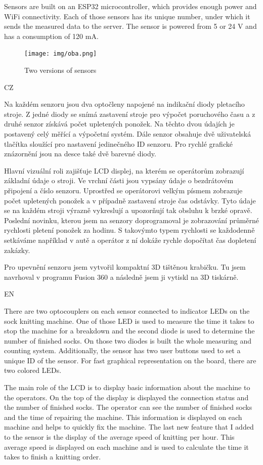 \documentclass[12pt, a4paper]{article}
\begin{document}
Sensors are built on an ESP32 microcontroller, which provides enough power and WiFi connectivity.
Each of those sensors has its unique number, under which it sends the measured data to the server.
The sensor is powered from 5 or 24 V and has a consumption of 120 mA.

\begin{figure}[t]
    \centering
    \texttt{[image: img/oba.png]}
    \caption{Two versions of sensors}
    \label{fig:dveVerze}
\end{figure}

CZ

Na každém senzoru jsou dva optočleny napojené na indikační diody pletacího stroje.
Z jedné diody se snímá zastavení stroje pro výpočet poruchového času a z druhé senzor získává počet upletených ponožek.
Na těchto dvou údajích je postavený celý měřící a výpočetní systém.
Dále senzor obsahuje dvě uživatelská tlačítka sloužící pro nastavení jedinečného ID senzoru.
Pro rychlé grafické znázornění jsou na desce také dvě barevné diody.

Hlavní vizuální roli zajišťuje LCD displej, na kterém se operátorům zobrazují základní údaje o stroji.
Ve vrchní části jsou vypsány údaje o bezdrátovém připojení a číslo senzoru.
Uprostřed se operátorovi velkým písmem zobrazuje počet upletených ponožek a v případně zastavení stroje čas odstávky.
Tyto údaje se na každém stroji výrazně vykreslují a upozorňují tak obsluhu k brzké opravě.
Poslední novinku, kterou jsem na senzory doprogramoval je zobrazování průměrné rychlosti pletení ponožek za hodinu.
S takovýmto typem rychlosti se každodenně setkáváme například v autě a operátor z ní dokáže rychle dopočítat čas dopletení zakázky.

Pro upevnění senzoru jsem vytvořil kompaktní 3D tištěnou krabičku.
Tu jsem navrhoval v programu Fusion 360 a následně jsem ji vytiskl na 3D tiskárně.

EN

There are two optocouplers on each sensor connected to indicator LEDs on the sock knitting machine.
One of those LED is used to measure the time it takes to stop the machine for a breakdown and the second diode is used to determine the number of finished socks.
On those two diodes is built the whole measuring and counting system.
Additionally, the sensor has two user buttons used to set a unique ID of the sensor.
For fast graphical representation on the board, there are two colored LEDs.

The main role of the LCD is to display basic information about the machine to the operators.
On the top of the display is displayed the connection status and the number of finished socks.
The operator can see the number of finished socks and the time of repairing the machine.
This information is displayed on each machine and helps to quickly fix the machine.
The last new feature that I added to the sensor is the display of the average speed of knitting per hour.
This average speed is displayed on each machine and is used to calculate the time it takes to finish a knitting order.
\end{document}
